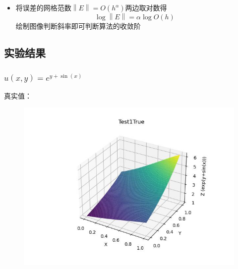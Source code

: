 \documentclass{article}
\begin{document}
\begin{itemize}
\begin{figure}[h]
    \end{figure}
    \item 将误差的网格范数$\left \| E \right \| = O(h^{\alpha})$两边取对数得$$\log\left \| E \right \| = \alpha \log O(h)$$
        绘制图像判断斜率即可判断算法的收敛阶
\end{itemize}

\newpage
\subsection{实验结果}
\subsubsection{$u(x,y)=e^{y+\sin(x)}$}
真实值：
\begin{figure}[h]
    \centering
    \includegraphics[width=0.7\linewidth]{Test1True.jpg}
\end{figure}
\end{document}
